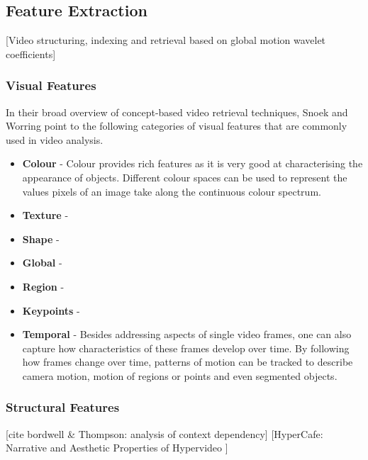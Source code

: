 \subsection{Feature Extraction}
[Video structuring, indexing and retrieval based on global motion wavelet coefficients]\cite{Bruno:2002tt}

\subsubsection{Visual Features}

In their broad overview of concept-based video retrieval techniques, Snoek and Worring point to the following categories of visual features that are commonly used in video analysis.

\begin{itemize}
  \item \textbf{Colour} - Colour provides rich features as it is very good at characterising the appearance of objects. Different colour spaces can be used to represent the values pixels of an image take along the continuous colour spectrum.

  \item \textbf{Texture} - 

  \item \textbf{Shape} - 

  \item \textbf{Global} - 

  \item \textbf{Region} - 

  \item \textbf{Keypoints} - 

  \item \textbf{Temporal} -  Besides addressing aspects of single video frames, one can also capture how characteristics of these frames develop over time. By following how frames change over time, patterns of motion can be tracked to describe camera motion, motion of regions or points and even segmented objects.

\end{itemize}


\subsubsection{Structural Features}
[cite bordwell \& Thompson: analysis of context dependency]
[HyperCafe: Narrative and Aesthetic Properties of Hypervideo \cite{Sawhney:1996tk}]

